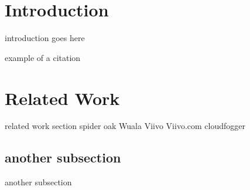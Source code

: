 \section{Introduction}
introduction goes here

example of a citation \cite{epfl-mobility-2009-02-24}

\section{Related Work}
related work section
spider oak
Wuala
Viivo Viivo.com
cloudfogger

\subsection{another subsection}
another subsection

